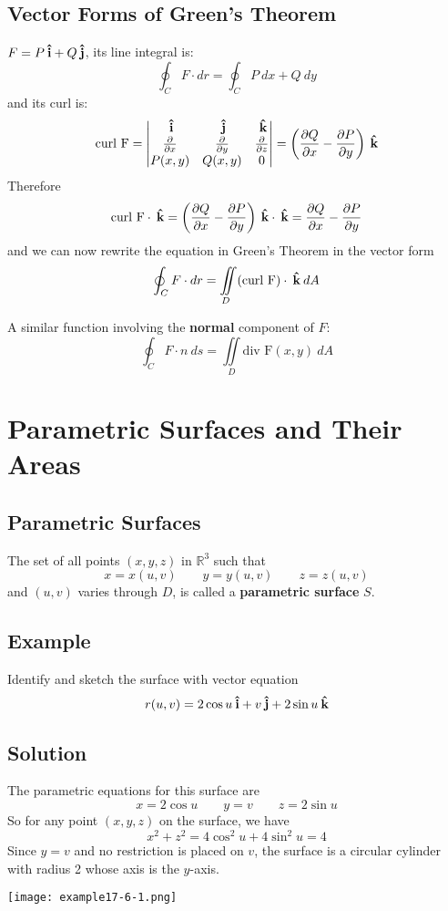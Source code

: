 \subsection*{Vector Forms of Green's Theorem}
$F=P\:\boldsymbol{\hat{\textbf{i}}}+Q\:\boldsymbol{\hat{\textbf{j}}}$, its line integral is:
$$\oint_C F\cdot dr=\oint_C P\:dx + Q\:dy$$
and its curl is:
$$\text{curl F}=\begin{vmatrix}
                \:\boldsymbol{\hat{\textbf{i}}}     & \:\boldsymbol{\hat{\textbf{j}}}     & \:\boldsymbol{\hat{\textbf{k}}}     \\
                \pdv{}{x} & \pdv{}{y} & \pdv{}{z} \\
                P(x,y)    & Q(x,y)    & 0
        \end{vmatrix}=
        \left(\pdv{Q}{x}-\pdv{P}{y}\right)\:\boldsymbol{\hat{\textbf{k}}}$$
Therefore
$$\text{curl F}\cdot \:\boldsymbol{\hat{\textbf{k}}} = \left(\pdv{Q}{x}-\pdv{P}{y}\right)\:\boldsymbol{\hat{\textbf{k}}}\cdot\:\boldsymbol{\hat{\textbf{k}}}=\pdv{Q}{x}-\pdv{P}{y}$$
and we can now rewrite the equation in Green’s Theorem in the vector form
$$\oint_C F\cdot dr=\iint\limits_D (\text{curl F})\cdot\:\boldsymbol{\hat{\textbf{k}}}\:dA$$

A similar function involving the \textbf{normal} component of $F$:
$$\oint_C F\cdot n\:ds=\iint\limits_D \text{div F}(x,y)\:dA$$

\section{Parametric Surfaces and Their Areas}

\subsection*{Parametric Surfaces}
The set of all points $(x,y,z)$ in $\mathbb{R}^3$ such that
$$x=x(u,v) \qquad y=y(u,v) \qquad z=z(u,v)$$
and $(u,v)$ varies through $D$, is called a \textbf{parametric surface} $S$.

\subsection*{Example}
Identify and sketch the surface with vector equation
$$r(u,v)=2\cos{u}\:\boldsymbol{\hat{\textbf{i}}} + v\:\boldsymbol{\hat{\textbf{j}}} + 2\sin{u}\:\boldsymbol{\hat{\textbf{k}}}$$

\subsection*{Solution}
The parametric equations for this surface are
$$x=2\cos{u}\qquad y=v \qquad z=2\sin{u}$$
So for any point $(x,y,z)$ on the surface, we have
$$x^2+z^2=4\cos^2{u}+4\sin^2{u}=4$$
Since $y=v$ and no restriction is placed on $v$, the surface  is a circular cylinder with radius 2 whose axis is the $y$-axis.
\begin{center}
        \texttt{[image: example17-6-1.png]}
\end{center}

